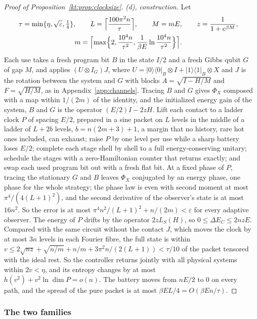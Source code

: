 \begin{proof}[Proof of Proposition~\ref{kt:prop:clocksize}]
\emph{(d), construction.} Let
\begin{gather*}
\tau=\min\{\eta,\sqrt\varepsilon,\tfrac14\},\qquad L=\Bigl\lceil\frac{100\pi^2n}{\tau}\Bigr\rceil,\qquad M=mE,\qquad z=\frac1{1+e^{\beta M}},\\
m=\Bigl\lceil\max\Bigl\{2,\frac{10^4n}{\tau^2},\frac1{\beta E}\ln\frac{10^4n}{\tau^2}\Bigr\}\Bigr\rceil.
\end{gather*} Each use takes a fresh program bit $B$ in the state $I/2$ and a fresh Gibbs qubit $G$ of gap $M$, and applies $(U\otimes I_G)J$, where $U=|0\rangle\langle0|_B\otimes I+|1\rangle\langle1|_B\otimes X$ and $J$ is the rotation between the system and $G$ with blocks $A=\sqrt{I-H/M}$ and $F=\sqrt{H/M}$, as in Appendix~\ref{app:channels}. Tracing $B$ and $G$ gives $\Phi_X$ composed with a map within $1/(2m)$ of the identity, and the initialized energy gain of the system, $B$ and $G$ is the operator $(E/2)I-2zH$. Lift each contact to a ladder clock $P$ of spacing $E/2$, prepared in a sine packet on $L$ levels in the middle of a ladder of $L+2b$ levels, $b=n(2m+3)+1$, a margin that no history, rare hot ones included, can exhaust; raise $P$ by one level per use while a sharp battery loses $E/2$; complete each stage shell by shell to a full energy-conserving unitary; schedule the stages with a zero-Hamiltonian counter that returns exactly; and swap each used program bit out with a fresh flat bit. At a fixed phase of $P$, tracing the stationary $G$ and $B$ leaves $\Phi_X$ conjugated by an energy phase, one phase for the whole strategy; the phase law is even with second moment at most $\pi^4/(4(L+1)^2)$, and the second derivative of the observer's state is at most $16n^2$. So the error is at most $\pi^4n^2/(L+1)^2+n/(2m)<\varepsilon$ for every adaptive observer. The energy of $P$ drifts by the operator $2zL_S(H)$, so $0\le\Delta E_C\le2nzE$. Compared with the same circuit without the contact $J$, which moves the clock by at most $3n$ levels in each Fourier fibre, the full state is within $v\le2\sqrt{nz}+\sqrt{n/m}+n/m+3\pi^2n/(2(L+1))<\tau/10$ of the packet tensored with the ideal rest. So the controller returns jointly with all physical systems within $2v<\eta$, and its entropy changes by at most $h(v^2)+v^2\ln\dim P=o(n)$. The battery moves from $nE/2$ to $0$ on every path, and the spread of the pure packet is at most $\beta EL/4=O(\beta En/\tau)$.
\end{proof}

\subsubsection{The two families}\label{kt:pf:families}

